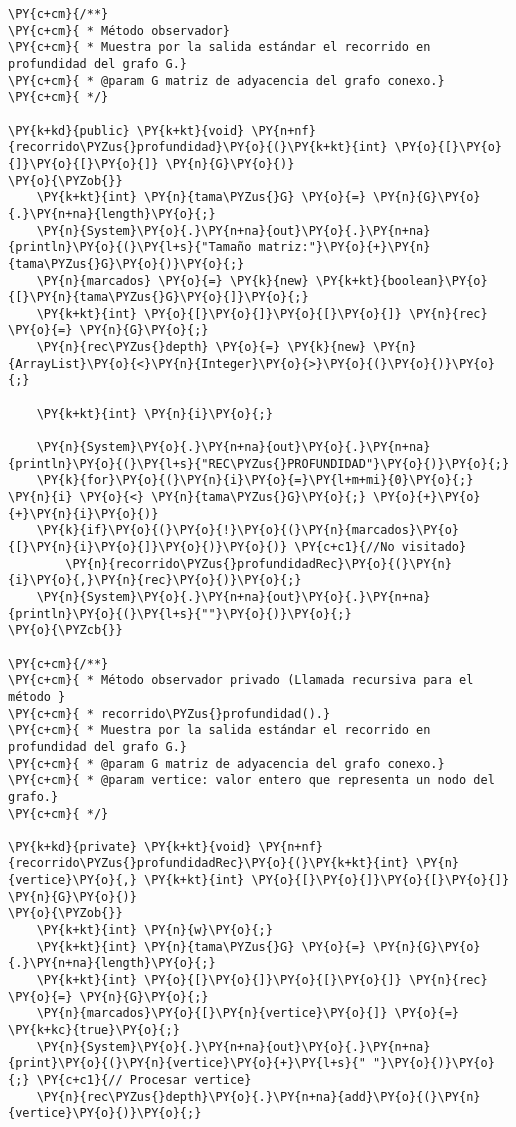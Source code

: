 \begin{Verbatim}[commandchars=\\\{\}]
\PY{c+cm}{/**}
\PY{c+cm}{ * Método observador}
\PY{c+cm}{ * Muestra por la salida estándar el recorrido en profundidad del grafo G.}
\PY{c+cm}{ * @param G matriz de adyacencia del grafo conexo.}
\PY{c+cm}{ */}

\PY{k+kd}{public} \PY{k+kt}{void} \PY{n+nf}{recorrido\PYZus{}profundidad}\PY{o}{(}\PY{k+kt}{int} \PY{o}{[}\PY{o}{]}\PY{o}{[}\PY{o}{]} \PY{n}{G}\PY{o}{)} 
\PY{o}{\PYZob{}}
    \PY{k+kt}{int} \PY{n}{tama\PYZus{}G} \PY{o}{=} \PY{n}{G}\PY{o}{.}\PY{n+na}{length}\PY{o}{;}
    \PY{n}{System}\PY{o}{.}\PY{n+na}{out}\PY{o}{.}\PY{n+na}{println}\PY{o}{(}\PY{l+s}{"Tamaño matriz:"}\PY{o}{+}\PY{n}{tama\PYZus{}G}\PY{o}{)}\PY{o}{;}
    \PY{n}{marcados} \PY{o}{=} \PY{k}{new} \PY{k+kt}{boolean}\PY{o}{[}\PY{n}{tama\PYZus{}G}\PY{o}{]}\PY{o}{;}
    \PY{k+kt}{int} \PY{o}{[}\PY{o}{]}\PY{o}{[}\PY{o}{]} \PY{n}{rec} \PY{o}{=} \PY{n}{G}\PY{o}{;}
    \PY{n}{rec\PYZus{}depth} \PY{o}{=} \PY{k}{new} \PY{n}{ArrayList}\PY{o}{<}\PY{n}{Integer}\PY{o}{>}\PY{o}{(}\PY{o}{)}\PY{o}{;}

    \PY{k+kt}{int} \PY{n}{i}\PY{o}{;}

    \PY{n}{System}\PY{o}{.}\PY{n+na}{out}\PY{o}{.}\PY{n+na}{println}\PY{o}{(}\PY{l+s}{"REC\PYZus{}PROFUNDIDAD"}\PY{o}{)}\PY{o}{;}
    \PY{k}{for}\PY{o}{(}\PY{n}{i}\PY{o}{=}\PY{l+m+mi}{0}\PY{o}{;} \PY{n}{i} \PY{o}{<} \PY{n}{tama\PYZus{}G}\PY{o}{;} \PY{o}{+}\PY{o}{+}\PY{n}{i}\PY{o}{)}
	\PY{k}{if}\PY{o}{(}\PY{o}{!}\PY{o}{(}\PY{n}{marcados}\PY{o}{[}\PY{n}{i}\PY{o}{]}\PY{o}{)}\PY{o}{)} \PY{c+c1}{//No visitado}
	    \PY{n}{recorrido\PYZus{}profundidadRec}\PY{o}{(}\PY{n}{i}\PY{o}{,}\PY{n}{rec}\PY{o}{)}\PY{o}{;}
    \PY{n}{System}\PY{o}{.}\PY{n+na}{out}\PY{o}{.}\PY{n+na}{println}\PY{o}{(}\PY{l+s}{""}\PY{o}{)}\PY{o}{;}
\PY{o}{\PYZcb{}}

\PY{c+cm}{/**}
\PY{c+cm}{ * Método observador privado (Llamada recursiva para el método }
\PY{c+cm}{ * recorrido\PYZus{}profundidad().}
\PY{c+cm}{ * Muestra por la salida estándar el recorrido en profundidad del grafo G.}
\PY{c+cm}{ * @param G matriz de adyacencia del grafo conexo.}
\PY{c+cm}{ * @param vertice: valor entero que representa un nodo del grafo.}
\PY{c+cm}{ */}

\PY{k+kd}{private} \PY{k+kt}{void} \PY{n+nf}{recorrido\PYZus{}profundidadRec}\PY{o}{(}\PY{k+kt}{int} \PY{n}{vertice}\PY{o}{,} \PY{k+kt}{int} \PY{o}{[}\PY{o}{]}\PY{o}{[}\PY{o}{]} \PY{n}{G}\PY{o}{)} 
\PY{o}{\PYZob{}}
    \PY{k+kt}{int} \PY{n}{w}\PY{o}{;}
    \PY{k+kt}{int} \PY{n}{tama\PYZus{}G} \PY{o}{=} \PY{n}{G}\PY{o}{.}\PY{n+na}{length}\PY{o}{;}
    \PY{k+kt}{int} \PY{o}{[}\PY{o}{]}\PY{o}{[}\PY{o}{]} \PY{n}{rec} \PY{o}{=} \PY{n}{G}\PY{o}{;}
    \PY{n}{marcados}\PY{o}{[}\PY{n}{vertice}\PY{o}{]} \PY{o}{=} \PY{k+kc}{true}\PY{o}{;}
    \PY{n}{System}\PY{o}{.}\PY{n+na}{out}\PY{o}{.}\PY{n+na}{print}\PY{o}{(}\PY{n}{vertice}\PY{o}{+}\PY{l+s}{" "}\PY{o}{)}\PY{o}{;} \PY{c+c1}{// Procesar vertice}
    \PY{n}{rec\PYZus{}depth}\PY{o}{.}\PY{n+na}{add}\PY{o}{(}\PY{n}{vertice}\PY{o}{)}\PY{o}{;}


\end{Verbatim}
